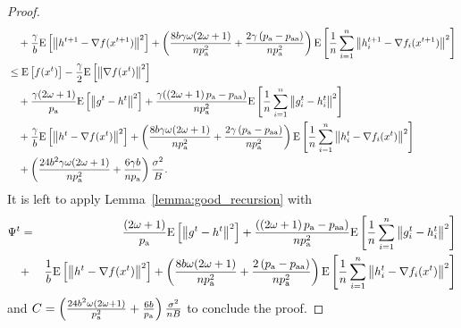 \documentclass{article}
\newcommand*{\probavailable}{\ensuremath{p_{\textnormal{a}}}}
\newcommand*{\probpairaa}{\ensuremath{p_{\textnormal{aa}}}}
\begin{document}
\begin{proof}
\begin{align*}
      &\quad  + \frac{\gamma}{b} \Exp{\norm{h^{t+1} - \nabla f(x^{t+1})}^2} + \left(\frac{8 b \gamma \omega (2 \omega + 1)}{n \probavailable^2} + \frac{2 \gamma \left(\probavailable - \probpairaa\right)}{n \probavailable^2}\right) \Exp{\frac{1}{n}\sum_{i=1}^n\norm{h^{t+1}_i - \nabla f_i(x^{t+1})}^2}\\
      &\leq \Exp{f(x^t)} - \frac{\gamma}{2}\Exp{\norm{\nabla f(x^t)}^2} \\
      &\quad + \frac{\gamma (2 \omega + 1)}{\probavailable} \Exp{\norm{g^{t} - h^{t}}^2} + \frac{\gamma (\left(2 \omega + 1\right)\probavailable - \probpairaa)}{n \probavailable^2} \Exp{\frac{1}{n}\sum_{i=1}^n\norm{g^{t}_i - h^{t}_i}^2} \\
      &\quad + \frac{\gamma}{b} \Exp{\norm{h^{t} - \nabla f(x^{t})}^2} + \left(\frac{8 b \gamma \omega (2 \omega + 1)}{n \probavailable^2} + \frac{2 \gamma \left(\probavailable - \probpairaa\right)}{n \probavailable^2}\right)\Exp{\frac{1}{n}\sum_{i=1}^n\norm{h^{t}_i - \nabla f_i(x^{t})}^2} \\
      &\quad + \left(\frac{24 b^2 \gamma \omega (2 \omega + 1)}{n \probavailable^2} + \frac{6 \gamma b}{n \probavailable}\right) \frac{\sigma^2}{B}.
    \end{align*}
    It is left to apply Lemma~\ref{lemma:good_recursion} with 
    \begin{eqnarray*}
      \Psi^t &=& \frac{(2 \omega + 1)}{\probavailable} \Exp{\norm{g^{t} - h^{t}}^2} + \frac{(\left(2 \omega + 1\right)\probavailable - \probpairaa)}{n \probavailable^2} \Exp{\frac{1}{n}\sum_{i=1}^n\norm{g^{t}_i - h^{t}_i}^2} \\
      &+& \frac{1}{b} \Exp{\norm{h^{t} - \nabla f(x^{t})}^2} + \left(\frac{8 b \omega (2 \omega + 1)}{n \probavailable^2} + \frac{2 \left(\probavailable - \probpairaa\right)}{n \probavailable^2}\right)\Exp{\frac{1}{n}\sum_{i=1}^n\norm{h^{t}_i - \nabla f_i(x^{t})}^2}
    \end{eqnarray*}
    and $C = \left(\frac{24 b^2 \omega (2 \omega + 1)}{\probavailable^2} + \frac{6b}{\probavailable}\right) \frac{\sigma^2}{n B}$
    to conclude the proof.
  \end{proof}

  \COROLLARYSTOCHASTIC*
\end{document}

